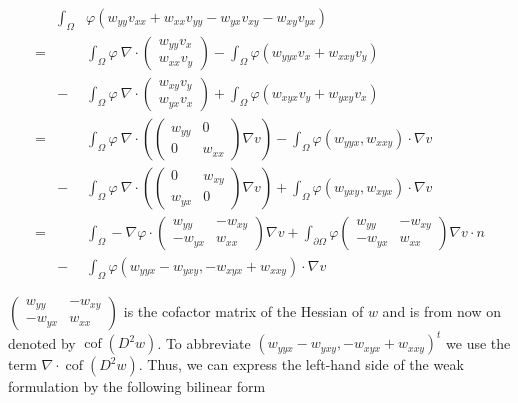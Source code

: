 \documentclass[a4paper,11pt]{article}
\newcommand{\myint}{\displaystyle\int}
\newcommand{\cof}{\operatorname{cof}}
\begin{document}
\begin{eqnarray*}
	&\myint_{\Omega}& \varphi (w_{yy} v_{xx}+w_{xx} v_{yy}- w_{yx} v_{xy} - w_{xy} v_{yx}) \\
	= && \myint_{\Omega} \varphi \: \nabla \cdot \begin{pmatrix} w_{yy} v_x \\ w_{xx} v_y \end{pmatrix} - \myint_\Omega \varphi (w_{yyx}v_x + w_{xxy}v_y) \\
	&-&\myint_{\Omega} \varphi \: \nabla \cdot \begin{pmatrix} w_{xy} v_y \\ w_{yx} v_x \end{pmatrix}  + \myint_\Omega \varphi  (w_{xyx}v_y + w_{yxy}v_x ) \\ 
	= && \myint_{\Omega} \varphi\: \nabla \cdot \left( \begin{pmatrix} w_{yy} & 0 \\ 0 & w_{xx} \end{pmatrix} \nabla v \right) - \myint_\Omega \varphi \left(w_{yyx} , w_{xxy} \right) \cdot \nabla v\\ 
	&- & \myint_{\Omega} \varphi\: \nabla \cdot \left( \begin{pmatrix} 0 & w_{xy}  \\ w_{yx} & 0 \end{pmatrix} \nabla v \right) + \myint_\Omega \varphi \left(w_{yxy} , w_{xyx} \right) \cdot \nabla v\\ 
	= && \myint_{\Omega} -\nabla \varphi \cdot \begin{pmatrix} w_{yy} & -w_{xy} \\ -w_{yx} & w_{xx} \end{pmatrix} \nabla v + \myint_{\partial \Omega} \varphi \begin{pmatrix} w_{yy} & -w_{xy} \\ -w_{yx} & w_{xx} \end{pmatrix} \nabla v \cdot n \\
	&- & \myint_\Omega \varphi \left( w_{yyx}-w_{yxy}, -w_{xyx} + w_{xxy} \right) \cdot \nabla v
\end{eqnarray*}

$\begin{pmatrix} w_{yy} & -w_{xy} \\ -w_{yx} & w_{xx} \end{pmatrix}$ is the cofactor matrix of the Hessian of $w$ and is from now on denoted by $\cof(D^2 w)$. 
To abbreviate $\left( w_{yyx}-w_{yxy}, -w_{xyx} + w_{xxy} \right)^t$ we use the term  $\nabla \cdot \cof(D^2 w)$.
Thus, we can express the left-hand side of the weak formulation by the following bilinear form
\end{document}

